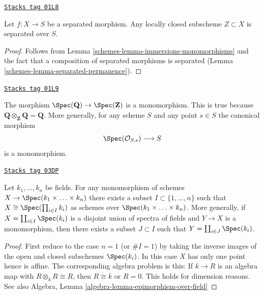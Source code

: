 \begin{lemma}
\label{schemes-lemma-subscheme-of-separated-scheme}
\href{https://stacks.math.columbia.edu/tag/01L8}{\texttt{Stacks tag 01L8}}

Let $f : X \to S$ be a separated morphism.
Any locally closed subscheme $Z \subset X$ is separated over $S$.
\end{lemma}

\begin{proof}

Follows from Lemma \ref{schemes-lemma-immersions-monomorphisms}
and the fact that a composition of separated morphisms is separated
(Lemma \ref{schemes-lemma-separated-permanence}).
\end{proof}

\begin{example}[Q over Z]
\label{schemes-example-Q-over-Z}
\href{https://stacks.math.columbia.edu/tag/01L9}{\texttt{Stacks tag 01L9}}

The morphism $\Spec(\mathbf{Q}) \to \Spec(\mathbf{Z})$
is a monomorphism. This is true because
$\mathbf{Q} \otimes_{\mathbf{Z}} \mathbf{Q} = \mathbf{Q}$.
More generally, for any scheme $S$ and any point $s \in S$ the
canonical morphism
$$
\Spec(\mathcal{O}_{S, s}) \longrightarrow S
$$
is a monomorphism.
\end{example}

\begin{lemma}
\label{schemes-lemma-mono-towards-spec-field}
\href{https://stacks.math.columbia.edu/tag/03DP}{\texttt{Stacks tag 03DP}}

Let $k_1, \ldots, k_n$ be fields.
For any monomorphism of schemes
$X \to \Spec(k_1 \times \ldots \times k_n)$
there exists a subset $I \subset \{1, \ldots, n\}$ such
that $X \cong \Spec(\prod_{i \in I} k_i)$ as
schemes over $\Spec(k_1 \times \ldots \times k_n)$.
More generally, if $X = \coprod_{i \in I} \Spec(k_i)$
is a disjoint union of spectra of fields and $Y \to X$ is a monomorphism,
then there exists a subset $J \subset I$ such that
$Y = \coprod_{i \in J} \Spec(k_i)$.
\end{lemma}

\begin{proof}
First reduce to the case $n = 1$ (or $\# I = 1$)
by taking the inverse images of the
open and closed subschemes $\Spec(k_i)$.
In this case $X$ has only one point hence is affine.
The corresponding algebra problem is this:
If $k \to R$ is an algebra map
with $R \otimes_k R \cong R$, then $R \cong k$ or $R = 0$.
This holds for dimension reasons.
See also
Algebra, Lemma \ref{algebra-lemma-epimorphism-over-field}
\end{proof}

